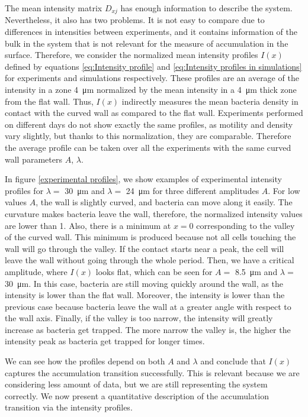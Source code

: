 The mean intensity matrix $D_{xj}$ has enough information to describe the system. Nevertheless, it also has two problems. It is not easy to compare due to differences in intensities between experiments, and it contains information of the bulk in the system that is not relevant for the measure of accumulation in the surface. Therefore, we consider the normalized mean intensity profiles $I(x)$ defined by equations \eqref{eq:Intensity profile} and \eqref{eq:Intensity profiles in simulations} for experiments and simulations respectively. These profiles are an average of the intensity in a zone \SI{4}{\micro\meter} normalized by the mean intensity in a \SI{4}{\micro\meter} thick zone from the flat wall. Thus, $I(x)$ indirectly measures the mean bacteria density in contact with the curved wall as compared to the flat wall. Experiments performed on different days do not show exactly the same profiles, as motility and density vary slightly, but thanks to this normalization, they are comparable. Therefore the average profile can be taken over all the experiments with the same curved wall parameters $A$, $\lambda$.   

In figure \ref{experimental profiles}, we show examples of experimental intensity profiles for $\lambda=$ \SI{30}{\micro\meter} and $\lambda= $ \SI{24}{\micro\meter} for three different amplitudes $A$. For low values $A$, the wall is slightly curved, and bacteria can move along it easily. The curvature makes bacteria leave the wall, therefore, the normalized intensity values are lower than 1. Also, there is a minimum at $x=0$ corresponding to the valley of the curved wall. This minimum is produced because not all cells touching the wall will go through the valley. If the contact starts near a peak, the cell will leave the wall without going through the whole period. Then, we have a critical amplitude, where $I(x)$ looks flat, which can be seen for $A=$ \SI{8.5}{\micro\meter} and $\lambda= $ \SI{30}{\micro\meter}. In this case, bacteria are still moving quickly around the wall, as the intensity is lower than the flat wall. Moreover, the intensity is lower than the previous case because bacteria leave the wall at a greater angle with respect to the wall axis. Finally, if the valley is too narrow, the intensity will greatly increase as bacteria get trapped. The more narrow the valley is, the higher the intensity peak as bacteria get trapped for longer times.

We can see how the profiles depend on both $A$ and $\lambda$ and conclude that $I(x)$ captures the accumulation transition successfully. This is relevant because we are considering less amount of data, but we are still representing the system correctly. We now present a quantitative description of the accumulation transition via the intensity profiles.


